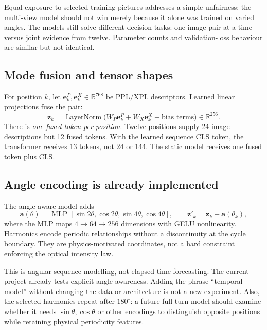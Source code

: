 Equal exposure to selected training pictures addresses a simple unfairness: the multi-view model should not win merely because it alone was trained on varied angles. The models still solve different decision tasks: one image pair at a time versus joint evidence from twelve. Parameter counts and validation-loss behaviour are similar but not identical.

\subsection{Mode fusion and tensor shapes}
For position $k$, let $\mathbf e_k^P,\mathbf e_k^X\in\mathbb R^{768}$ be PPL/XPL descriptors. Learned linear projections fuse the pair:
\begin{equation}
\mathbf z_k=\operatorname{LayerNorm}\big(W_P\mathbf e_k^P+W_X\mathbf e_k^X+\text{bias terms}\big)
\in\mathbb R^{256}.
\end{equation}
There is \emph{one fused token per position}. Twelve positions supply 24 image descriptions but 12 fused tokens. With the learned sequence CLS token, the transformer receives 13 tokens, not 24 or 144. The static model receives one fused token plus CLS.

\subsection{Angle encoding is already implemented}
The angle-aware model adds
\begin{equation}
\mathbf a(\theta)=\operatorname{MLP}\left[
\sin2\theta,\cos2\theta,\sin4\theta,\cos4\theta\right],
\qquad \mathbf z'_k=\mathbf z_k+\mathbf a(\theta_k),
\end{equation}
where the MLP maps $4\to64\to256$ dimensions with GELU nonlinearity. Harmonics encode periodic relationships without a discontinuity at the cycle boundary. They are physics-motivated coordinates, not a hard constraint enforcing the optical intensity law.

This is angular sequence modelling, not elapsed-time forecasting. The current project already tests explicit angle awareness. Adding the phrase ``temporal model'' without changing the data or architecture is not a new experiment. Also, the selected harmonics repeat after $180^\circ$: a future full-turn model should examine whether it needs $\sin\theta,\cos\theta$ or other encodings to distinguish opposite positions while retaining physical periodicity features.

